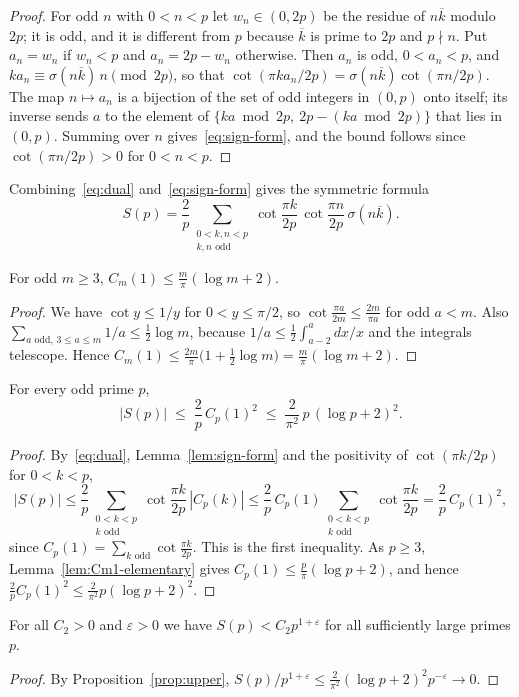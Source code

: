 \begin{proof}
For odd $n$ with $0<n<p$ let $w_n\in(0,2p)$ be the residue of $n\overline k$ modulo $2p$; it is odd, and it is different from $p$ because $\overline k$ is prime to $2p$ and $p\nmid n$. Put $a_n=w_n$ if $w_n<p$ and $a_n=2p-w_n$ otherwise. Then $a_n$ is odd, $0<a_n<p$, and $ka_n\equiv\sigma(n\overline k)\,n\pmod{2p}$, so that $\cot(\pi ka_n/2p)=\sigma(n\overline k)\cot(\pi n/2p)$. The map $n\mapsto a_n$ is a bijection of the set of odd integers in $(0,p)$ onto itself; its inverse sends $a$ to the element of $\{ka\bmod2p,\ 2p-(ka\bmod2p)\}$ that lies in $(0,p)$. Summing over $n$ gives~\eqref{eq:sign-form}, and the bound follows since $\cot(\pi n/2p)>0$ for $0<n<p$.
\end{proof}

Combining~\eqref{eq:dual} and~\eqref{eq:sign-form} gives the symmetric formula
\[
S(p)=\frac2p\sum_{\substack{0<k,n<p\\ k,n\text{ odd}}}\cot\frac{\pi k}{2p}\,\cot\frac{\pi n}{2p}\,\sigma(n\overline k).
\]

\begin{lemma}\label{lem:Cm1-elementary}
For odd $m\ge3$, $C_m(1)\le\frac m\pi(\log m+2)$.
\end{lemma}

\begin{proof}
We have $\cot y\le1/y$ for $0<y\le\pi/2$, so $\cot\frac{\pi a}{2m}\le\frac{2m}{\pi a}$ for odd $a<m$. Also $\sum_{a\text{ odd},\,3\le a\le m}1/a\le\frac12\log m$, because $1/a\le\frac12\int_{a-2}^a dx/x$ and the integrals telescope. Hence $C_m(1)\le\frac{2m}\pi\bigl(1+\frac12\log m\bigr)=\frac m\pi(\log m+2)$.
\end{proof}

\begin{proposition}\label{prop:upper}
For every odd prime $p$,
\[
|S(p)|\;\le\;\frac2p\,C_p(1)^2\;\le\;\frac2{\pi^2}\,p\,(\log p+2)^2.
\]
\end{proposition}

\begin{proof}
By~\eqref{eq:dual}, Lemma~\ref{lem:sign-form} and the positivity of $\cot(\pi k/2p)$ for $0<k<p$,
\[
|S(p)|\le\frac2p\sum_{\substack{0<k<p\\ k\text{ odd}}}\cot\frac{\pi k}{2p}\,|C_p(k)|\le\frac2p\,C_p(1)\sum_{\substack{0<k<p\\ k\text{ odd}}}\cot\frac{\pi k}{2p}=\frac2p\,C_p(1)^2,
\]
since $C_p(1)=\sum_{k\text{ odd}}\cot\frac{\pi k}{2p}$. This is the first inequality. As $p\ge3$, Lemma~\ref{lem:Cm1-elementary} gives $C_p(1)\le\frac p\pi(\log p+2)$, and hence $\frac2pC_p(1)^2\le\frac2{\pi^2}p(\log p+2)^2$.
\end{proof}

\begin{corollary}
For all $C_2>0$ and $\varepsilon>0$ we have $S(p)<C_2p^{1+\varepsilon}$ for all sufficiently large primes $p$.
\end{corollary}

\begin{proof}
By Proposition~\ref{prop:upper}, $S(p)/p^{1+\varepsilon}\le\frac2{\pi^2}(\log p+2)^2p^{-\varepsilon}\to0$.
\end{proof}
